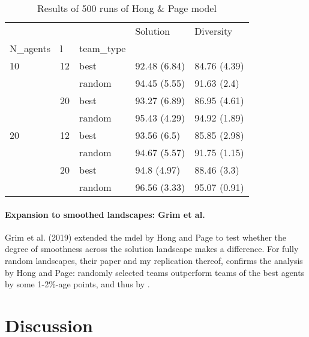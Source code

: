 \begin{table}
   \centering
   \caption{Results of 500 runs of Hong & Page model}
   \begin{tabular}{lllll}
   \toprule
      &    &        &      Solution &     Diversity \\
   N\_agents & l & team\_type &               &               \\
   \midrule
   10 & 12 & best &  92.48 (6.84) &  84.76 (4.39) \\
      &    & random &  94.45 (5.55) &   91.63 (2.4) \\
      & 20 & best &  93.27 (6.89) &  86.95 (4.61) \\
      &    & random &  95.43 (4.29) &  94.92 (1.89) \\
   20 & 12 & best &   93.56 (6.5) &  85.85 (2.98) \\
      &    & random &  94.67 (5.57) &  91.75 (1.15) \\
      & 20 & best &   94.8 (4.97) &   88.46 (3.3) \\
      &    & random &  96.56 (3.33) &  95.07 (0.91) \\
   \bottomrule
   \end{tabular}
   \end{table}
   
    
\subsubsection{Expansion to smoothed landscapes: Grim et al.}

Grim et al. (2019) extended the mdel by Hong and Page to test whether the degree of smoothness across the solution landscape makes a difference. For fully random landscapes, their paper and my replication thereof, confirms the analysis by Hong and Page: randomly selected teams outperform teams of the best agents by some 1-2\%-age points, and thus by .

\chapter{Discussion}

